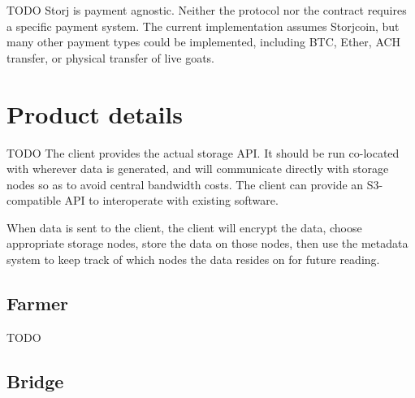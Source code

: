 \documentclass[a4paper,10pt]{article}
\newcommand{\todo}[1]{{\color{red} TODO #1}}
\begin{document}
\todo{
Storj is payment agnostic. Neither the protocol nor the contract requires a
specific payment system. The current implementation assumes Storjcoin, but many
other payment types could be implemented, including BTC, Ether, ACH transfer, or
physical transfer of live goats.
}

\section{Product details}\label{sec:product_details}

\todo{
The client provides the actual storage API. It should be run co-located with
wherever data is generated, and will communicate directly with storage nodes
so as to avoid central bandwidth costs. The client can provide an S3-compatible
API to interoperate with existing software.

When data is sent to the client, the client will encrypt the data, choose
appropriate storage nodes, store the data on those nodes, then use the metadata
system to keep track of which nodes the data resides on for future reading.
}

\subsection{Farmer}

\todo{}

\subsection{Bridge}
\end{document}
